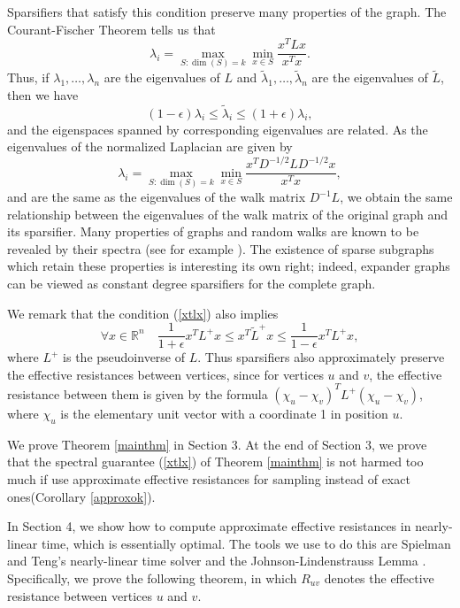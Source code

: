 \documentclass[11pt]{article}
\newcommand{\R}{\mathbb{R}}
\begin{document}
Sparsifiers that satisfy this condition preserve many properties of the graph.
The Courant-Fischer Theorem tells us that
\[ \lambda_i=\max_{S:\dim(S)=k}\min_{x\in S} \frac{x^TLx}{x^Tx}.\] 
Thus, if $\lambda_{1}, \dots , \lambda_{n}$
  are the eigenvalues of $L$ and $\tilde{\lambda}_{1}, \dots , \tilde{\lambda}_{n}$ are the eigenvalues
  of $\tilde{L}$, then we have
\[
  (1-\epsilon) \lambda_{i} \leq \tilde{\lambda}_{i} \leq (1+\epsilon) \lambda_{i},
\]
and the eigenspaces spanned by corresponding eigenvalues are related.
As the eigenvalues of the normalized Laplacian are given by
\[
 \lambda_i=\max_{S:\dim(S)=k}\min_{x\in S} \frac{x^T D^{-1/2} L D^{-1/2} x}{x^Tx},
\]
and are the same as the eigenvalues of the walk matrix $D^{-1} L$,
  we obtain the same relationship between the eigenvalues of the walk matrix of the original
  graph and its sparsifier.
Many properties of graphs and random walks are known to be revealed by their spectra (see 
  for example
\cite{bollobas,chung,GodsilRoyle}). 
The existence of sparse subgraphs which retain these properties is interesting its own right;
indeed, expander graphs can be viewed as constant degree sparsifiers for the complete graph.

We remark that the condition (\ref{xtlx}) also implies
\[ \forall x\in\R^n\quad \frac{1}{1+\epsilon}x^TL^{+}x\le x^T\tilde{L}^{+}x\le
\frac{1}{1-\epsilon}x^TL^{+}x,\]
where $L^{+}$ is the pseudoinverse of $L$.
Thus sparsifiers also approximately preserve the effective resistances between
vertices, since for vertices $u$ and $v$, the effective resistance between them is given by the formula
  $(\chi_{u} - \chi_{v})^{T} L^{+} (\chi_{u} - \chi_{v})$, where $\chi_{u}$ is the elementary unit vector with a coordinate
  1 in position $u$.

We prove Theorem \ref{mainthm} in Section 3. At the end of Section 3, we prove that
the spectral guarantee (\ref{xtlx}) of Theorem \ref{mainthm} is not harmed too
much if use approximate effective resistances for sampling instead of exact ones(Corollary \ref{approxok}).

In
Section 4, we show how to compute approximate effective resistances in
nearly-linear time, which is essentially optimal.
 The tools we use to do this are Spielman and Teng's
nearly-linear time solver \cite{st04,st06} and the Johnson-Lindenstrauss Lemma
\cite{jl,ach}. Specifically, we  prove the following theorem, in which
$R_{uv}$ denotes the effective resistance between vertices $u$ and $v$.
\end{document}
